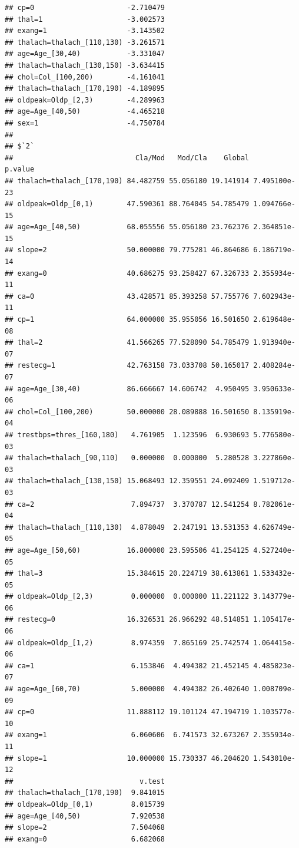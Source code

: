 \documentclass[]{article}
\begin{document}
\begin{verbatim}
## cp=0                      -2.710479
## thal=1                    -3.002573
## exang=1                   -3.143502
## thalach=thalach_[110,130) -3.261571
## age=Age_[30,40)           -3.331047
## thalach=thalach_[130,150) -3.634415
## chol=Col_[100,200)        -4.161041
## thalach=thalach_[170,190) -4.189895
## oldpeak=Oldp_[2,3)        -4.289963
## age=Age_[40,50)           -4.465218
## sex=1                     -4.750784
## 
## $`2`
##                             Cla/Mod   Mod/Cla    Global      p.value
## thalach=thalach_[170,190) 84.482759 55.056180 19.141914 7.495100e-23
## oldpeak=Oldp_[0,1)        47.590361 88.764045 54.785479 1.094766e-15
## age=Age_[40,50)           68.055556 55.056180 23.762376 2.364851e-15
## slope=2                   50.000000 79.775281 46.864686 6.186719e-14
## exang=0                   40.686275 93.258427 67.326733 2.355934e-11
## ca=0                      43.428571 85.393258 57.755776 7.602943e-11
## cp=1                      64.000000 35.955056 16.501650 2.619648e-08
## thal=2                    41.566265 77.528090 54.785479 1.913940e-07
## restecg=1                 42.763158 73.033708 50.165017 2.408284e-07
## age=Age_[30,40)           86.666667 14.606742  4.950495 3.950633e-06
## chol=Col_[100,200)        50.000000 28.089888 16.501650 8.135919e-04
## trestbps=thres_[160,180)   4.761905  1.123596  6.930693 5.776580e-03
## thalach=thalach_[90,110)   0.000000  0.000000  5.280528 3.227860e-03
## thalach=thalach_[130,150) 15.068493 12.359551 24.092409 1.519712e-03
## ca=2                       7.894737  3.370787 12.541254 8.782061e-04
## thalach=thalach_[110,130)  4.878049  2.247191 13.531353 4.626749e-05
## age=Age_[50,60)           16.800000 23.595506 41.254125 4.527240e-05
## thal=3                    15.384615 20.224719 38.613861 1.533432e-05
## oldpeak=Oldp_[2,3)         0.000000  0.000000 11.221122 3.143779e-06
## restecg=0                 16.326531 26.966292 48.514851 1.105417e-06
## oldpeak=Oldp_[1,2)         8.974359  7.865169 25.742574 1.064415e-06
## ca=1                       6.153846  4.494382 21.452145 4.485823e-07
## age=Age_[60,70)            5.000000  4.494382 26.402640 1.008709e-09
## cp=0                      11.888112 19.101124 47.194719 1.103577e-10
## exang=1                    6.060606  6.741573 32.673267 2.355934e-11
## slope=1                   10.000000 15.730337 46.204620 1.543010e-12
##                              v.test
## thalach=thalach_[170,190)  9.841015
## oldpeak=Oldp_[0,1)         8.015739
## age=Age_[40,50)            7.920538
## slope=2                    7.504068
## exang=0                    6.682068

\end{verbatim}
\end{document}
